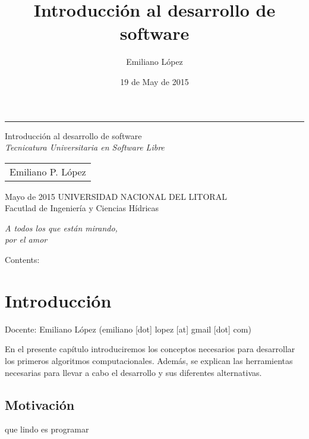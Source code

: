 \documentclass[a4paper,12pt,spanish]{sphinxmanual}
\title{Introducción al desarrollo de software}
\date{19 de May de 2015}
\author{Emiliano López}
\newcommand{\sphinxlogo}{}
\begin{document}

\begin{titlepage}%
    \let\footnotesize\small
    \let\footnoterule\relax
    \rule{\textwidth}{1pt}%
    \begin{flushright}%
      \sphinxlogo%
      \vspace{15 mm}
      {\rm\Huge Introducción al desarrollo de software\\ }
      {\em\large Tecnicatura Universitaria en Software Libre}
      \vfill
      {
        \begin{tabular}[t]{c}
          \large Emiliano P. López
        \end{tabular}
        \par}
      \vfill\vfill
      {\large
        Mayo de 2015
       \vfill
       UNIVERSIDAD NACIONAL DEL LITORAL\\
          Facutlad de Ingeniería y Ciencias Hídricas\\
      }%
    \end{flushright}%
  \end{titlepage}%
  \cleardoublepage%
  \label{pre:dedication}
  \vspace*{\fill}
  \begin{flushright}
    \emph{A todos los que están mirando,\\por el amor}
  \end{flushright}
  \vspace{\fill}

\tableofcontents
{}\label{index::doc}


Contents:


\chapter{Introducción}
\label{Unidad01:introduccion}\label{Unidad01::doc}\label{Unidad01:introduccion-al-desarrollo-de-software}
Docente: Emiliano López (emiliano {[}dot{]} lopez {[}at{]} gmail {[}dot{]} com)

En el presente capítulo introduciremos los conceptos necesarios para
desarrollar los primeros algoritmos computacionales. Además, se explican
las herramientas necesarias para llevar a cabo el desarrollo y sus
diferentes alternativas.


\section{Motivación}
\label{Unidad01:motivacion}
que lindo es programar
\end{document}
